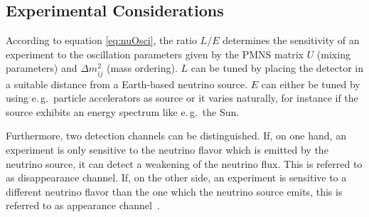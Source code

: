 \subsection{Experimental Considerations}
\label{sec:neutrinoPhysicsOscillationsExpConsiderations}
According to equation \eqref{eq:nuOsci}, the ratio $L/E$ determines the sensitivity of an experiment to the oscillation parameters given by the PMNS matrix $U$ (mixing parameters) and $\Delta m^2_{ij}$ (mass ordering). $L$ can be tuned by placing the detector in a suitable distance from a Earth-based neutrino source. $E$ can either be tuned by using e.\,g.~particle accelerators as source or it varies naturally, for instance if the source exhibits an energy spectrum like e.\,g.~the Sun. 

Furthermore, two detection channels can be distinguished. If, on one hand, an experiment is only sensitive to the neutrino flavor which is emitted by the neutrino source, it can detect a weakening of the neutrino flux. This is referred to as disappearance channel. If, on the other side, an experiment is sensitive to a different neutrino flavor than the one which the neutrino source emits, this is referred to as appearance channel~\cite{zuber2011neutrino}.

